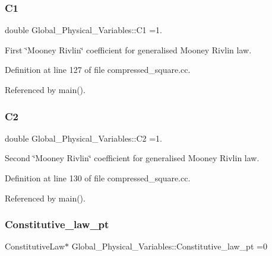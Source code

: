 \subsubsection{\texorpdfstring{C1}{C1}}
{\footnotesize\ttfamily double Global\+\_\+\+Physical\+\_\+\+Variables\+::\+C1 =1.}



First \char`\"{}\+Mooney Rivlin\char`\"{} coefficient for generalised Mooney Rivlin law. 



Definition at line 127 of file compressed\+\_\+square.\+cc.



Referenced by main().

\mbox{\label{namespaceGlobal__Physical__Variables_af9defd1b5745cce50d2c386b3ac0e0ae}} 
\subsubsection{\texorpdfstring{C2}{C2}}
{\footnotesize\ttfamily double Global\+\_\+\+Physical\+\_\+\+Variables\+::\+C2 =1.}



Second \char`\"{}\+Mooney Rivlin\char`\"{} coefficient for generalised Mooney Rivlin law. 



Definition at line 130 of file compressed\+\_\+square.\+cc.



Referenced by main().

\mbox{\label{namespaceGlobal__Physical__Variables_a2a37fb040c832ee7a086bb13bb02a100}} 
\subsubsection{\texorpdfstring{Constitutive\+\_\+law\+\_\+pt}{Constitutive\_law\_pt}}
{\footnotesize\ttfamily Constitutive\+Law$\ast$ Global\+\_\+\+Physical\+\_\+\+Variables\+::\+Constitutive\+\_\+law\+\_\+pt =0}



